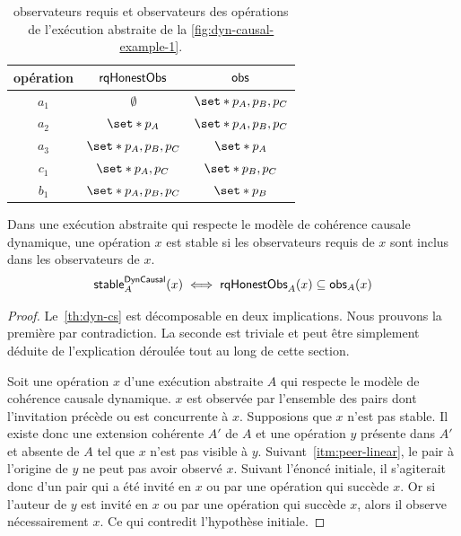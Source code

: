 \begin{table}[htb]
    \centering
    \begin{tabular}{c|c|c}
        opération & $\operatorname{\mathsf{rqHonestObs}}$ & $\operatorname{\mathsf{obs}}$ \\
        \hline
        $a_1$ & $\emptyset$ & $\set*{p_A, p_B, p_C}$ \\
        $a_2$ & $\set*{p_A}$ & $\set*{p_A, p_B, p_C}$ \\
        $a_3$ & $\set*{p_A, p_B, p_C}$ & $\set*{p_A}$ \\
        $c_1$ & $\set*{p_A, p_C}$ & $\set*{p_B, p_C}$\\
        $b_1$ & $\set*{p_A, p_B, p_C}$ & $\set*{p_B}$ \\
    \end{tabular}
    \caption[Observateurs requis]{observateurs requis et observateurs des opérations de l'exécution abstraite de la \autoref{fig:dyn-causal-example-1}.}\label{tab:rq-obs}
\end{table}



\begin{theorem}\label{th:dyn-cs}
Dans une exécution abstraite qui respecte le modèle de cohérence causale dynamique, une opération $x$ est stable si les observateurs requis de $x$ sont inclus dans les observateurs de $x$.
\begin{equation*}
    \operatorname{\mathsf{stable}}_A^{\operatorname{\mathsf{DynCausal}}}(x) \iff \operatorname{\mathsf{rqHonestObs}}_A(x) \subseteq \operatorname{\mathsf{obs}}_A(x)
\end{equation*}
\end{theorem}

\begin{proof}
Le~\autoref{th:dyn-cs} est décomposable en deux implications.
Nous prouvons la première par contradiction.
La seconde est triviale et peut être simplement déduite de l'explication déroulée tout au long de cette section.

Soit une opération $x$ d'une exécution abstraite $A$ qui respecte le modèle de cohérence causale dynamique.
$x$ est observée par l'ensemble des pairs dont l'invitation précède ou est concurrente à $x$.
Supposions que $x$ n'est pas stable.
Il existe donc une extension cohérente $A'$ de $A$ et une opération $y$ présente dans $A'$ et absente de $A$ tel que $x$ n'est pas visible à $y$.
Suivant~\autoref{itm:peer-linear}, le pair à l'origine de $y$ ne peut pas avoir observé $x$.
Suivant l'énoncé initiale, il s'agiterait donc d'un pair qui a été invité en $x$ ou par une opération qui succède $x$.
Or si l'auteur de $y$ est invité en $x$ ou par une opération qui succède $x$, alors il observe nécessairement $x$.
Ce qui contredit l'hypothèse initiale.
\end{proof}


